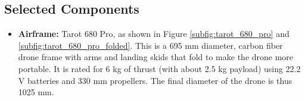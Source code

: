 \subsection{Selected Components}

\begin{itemize}
    
    \item \textbf{Airframe:} Tarot 680 Pro, as shown in Figure \ref{subfig:tarot_680_pro} and \ref{subfig:tarot_680_pro_folded}. This is a 695 mm diameter, carbon fiber drone frame with arms and landing skids that fold to make the drone more portable. It is rated for 6 kg of thrust (with about 2.5 kg payload) using 22.2 V batteries and 330 mm propellers. The final diameter of the drone is thus 1025 mm.



\end{itemize}
